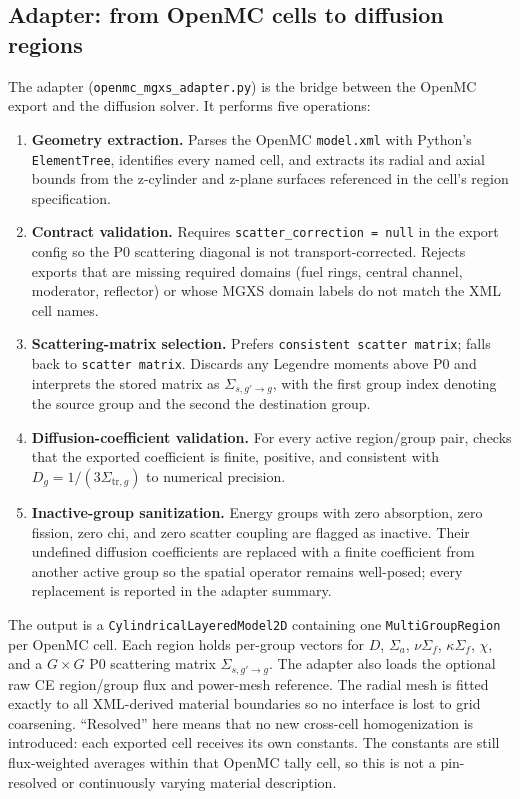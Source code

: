 \documentclass[11pt]{article}
\begin{document}
\subsection{Adapter: from OpenMC cells to diffusion regions}

The adapter (\texttt{openmc\_mgxs\_adapter.py}) is the bridge between the
OpenMC export and the diffusion solver.  It performs five operations:

\begin{enumerate}
  \item \textbf{Geometry extraction.}  Parses the OpenMC \texttt{model.xml}
        with Python's \texttt{ElementTree}, identifies every named cell, and
        extracts its radial and axial bounds from the z-cylinder and z-plane
        surfaces referenced in the cell's region specification.
  \item \textbf{Contract validation.}  Requires
        \texttt{scatter\_correction = null} in the export config so the P0
        scattering diagonal is not transport-corrected.  Rejects exports that
        are missing required domains (fuel rings, central channel, moderator,
        reflector) or whose MGXS domain labels do not match the XML cell names.
  \item \textbf{Scattering-matrix selection.}  Prefers
        \texttt{consistent scatter matrix}; falls back to \texttt{scatter matrix}.
        Discards any Legendre moments above P0 and interprets the stored matrix
        as $\Sigma_{s,g'\rightarrow g}$, with the first group index denoting the
        source group and the second the destination group.
  \item \textbf{Diffusion-coefficient validation.}  For every active
        region/group pair, checks that the exported coefficient is finite,
        positive, and consistent with
        $D_g=1/(3\Sigma_{\mathrm{tr},g})$ to numerical precision.
  \item \textbf{Inactive-group sanitization.}  Energy groups with zero
        absorption, zero fission, zero chi, and zero scatter coupling are
        flagged as inactive.  Their undefined diffusion coefficients are
        replaced with a finite coefficient from another active group so the
        spatial operator remains well-posed; every replacement is reported in
        the adapter summary.
\end{enumerate}

The output is a \texttt{CylindricalLayeredModel2D} containing one
\texttt{MultiGroupRegion} per OpenMC cell.  Each region holds per-group
vectors for $D$, $\Sigma_a$, $\nu\Sigma_f$, $\kappa\Sigma_f$, $\chi$, and a
$G\times G$ P0 scattering matrix $\Sigma_{s,g'\to g}$.  The adapter also
loads the optional raw CE region/group flux and power-mesh reference.  The
radial mesh is fitted exactly
to all XML-derived material boundaries so no interface is lost to grid
coarsening.  ``Resolved'' here means that no new cross-cell homogenization is
introduced: each exported cell receives its own constants.  The constants are
still flux-weighted averages within that OpenMC tally cell, so this is not a
pin-resolved or continuously varying material description.
\end{document}
